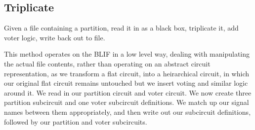 \documentclass[12pt,final,oneside]{dwThesis} %
\begin{document}
   \newpage
   \subsection{Triplicate}\label{algTriplicate}
   Given a file containing a partition, read it in as a black box, triplicate it, add voter logic, write back out to file.

   This method operates on the \ac{BLIF} in a low level way, dealing with manipulating the actual file contents, rather than operating on an abstract circuit representation, as we transform a flat circuit, into a heirarchical circuit, in which our original flat circuit remains untouched but we insert voting and similar logic around it.
   We read in our partition circuit and voter circuit. We now create three partition subcircuit and one voter subcircuit definitions. We match up our signal names between them appropriately, and then write out our subcircuit definitions, followed by our partition and voter subcircuits.
\end{document}
